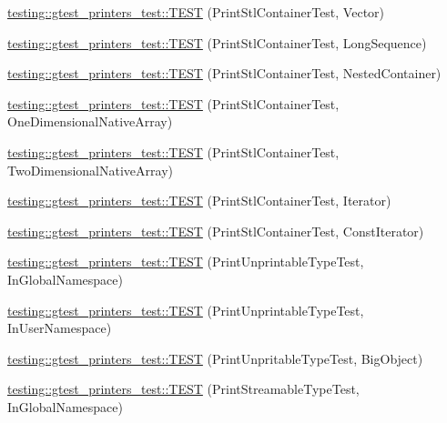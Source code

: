 \begin{DoxyCompactItemize}
\item 
\hyperlink{namespacetesting_1_1gtest__printers__test_abfab1ea62f0285c0cdbcca500be0dac8}{testing\+::gtest\+\_\+printers\+\_\+test\+::\+T\+E\+ST} (Print\+Stl\+Container\+Test, Vector)
\item 
\hyperlink{namespacetesting_1_1gtest__printers__test_a55eca253f3365ad26183bcc711cb257a}{testing\+::gtest\+\_\+printers\+\_\+test\+::\+T\+E\+ST} (Print\+Stl\+Container\+Test, Long\+Sequence)
\item 
\hyperlink{namespacetesting_1_1gtest__printers__test_ad8fb463805baecdfb95154dec6ec4f27}{testing\+::gtest\+\_\+printers\+\_\+test\+::\+T\+E\+ST} (Print\+Stl\+Container\+Test, Nested\+Container)
\item 
\hyperlink{namespacetesting_1_1gtest__printers__test_a6dd59bbdea483f662fe62e2c55c106ce}{testing\+::gtest\+\_\+printers\+\_\+test\+::\+T\+E\+ST} (Print\+Stl\+Container\+Test, One\+Dimensional\+Native\+Array)
\item 
\hyperlink{namespacetesting_1_1gtest__printers__test_aca371c218e2248562ed258eaf385f4d1}{testing\+::gtest\+\_\+printers\+\_\+test\+::\+T\+E\+ST} (Print\+Stl\+Container\+Test, Two\+Dimensional\+Native\+Array)
\item 
\hyperlink{namespacetesting_1_1gtest__printers__test_a01ec32faf0032f9fbcf4895d8d6e4aa9}{testing\+::gtest\+\_\+printers\+\_\+test\+::\+T\+E\+ST} (Print\+Stl\+Container\+Test, Iterator)
\item 
\hyperlink{namespacetesting_1_1gtest__printers__test_a3b54f9a039804190b7ff2e818169c0f2}{testing\+::gtest\+\_\+printers\+\_\+test\+::\+T\+E\+ST} (Print\+Stl\+Container\+Test, Const\+Iterator)
\item 
\hyperlink{namespacetesting_1_1gtest__printers__test_a805264fd24de8e65cba977a798abc54c}{testing\+::gtest\+\_\+printers\+\_\+test\+::\+T\+E\+ST} (Print\+Unprintable\+Type\+Test, In\+Global\+Namespace)
\item 
\hyperlink{namespacetesting_1_1gtest__printers__test_a0aa1499e978bdde6c71e49ecc9db695b}{testing\+::gtest\+\_\+printers\+\_\+test\+::\+T\+E\+ST} (Print\+Unprintable\+Type\+Test, In\+User\+Namespace)
\item 
\hyperlink{namespacetesting_1_1gtest__printers__test_a6b6fba2a191094244f8aa78a4933a2c5}{testing\+::gtest\+\_\+printers\+\_\+test\+::\+T\+E\+ST} (Print\+Unpritable\+Type\+Test, Big\+Object)
\item 
\hyperlink{namespacetesting_1_1gtest__printers__test_a80fe9d71227a97b12fd5336a823c3d17}{testing\+::gtest\+\_\+printers\+\_\+test\+::\+T\+E\+ST} (Print\+Streamable\+Type\+Test, In\+Global\+Namespace)

\end{DoxyCompactItemize}

